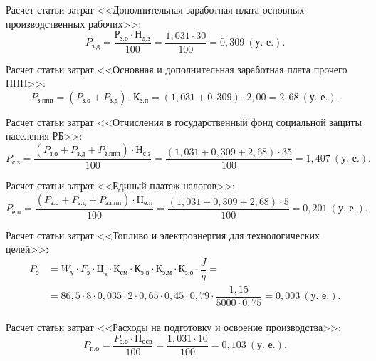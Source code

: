 Расчет статьи затрат 
<<Дополнительная заработная плата основных производственных рабочих>>:
\begin{equation*}
P_{\text{з.д}} = 
\dfrac{\text{Р}_{\text{з.о}} \cdot \text{Н}_{\text{д.з}}}{100} = 
\dfrac{1{,}031 \cdot 30}{100} = 
0{,}309 \: (\text{у.~е.}).
\end{equation*}

Расчет статьи затрат 
<<Основная и дополнительная заработная плата прочего ППП>>:
\begin{equation*}
P_{\text{з.ппп}} = 
( P_{\text{з.о}} + P_{\text{з.д}} ) \cdot \text{К}_{\text{з.п}} =
( 1{,}031 + 0{,}309 ) \cdot 2{,}00 =
2{,}68 \: (\text{у.~е.}).
\end{equation*}

Расчет статьи затрат 
<<Отчисления в государственный фонд социальной защиты населения РБ>>:
\begin{equation*}
P_{\text{с.з}} = 
\dfrac{
  (P_{\text{з.о}} + P_{\text{з.д}}  + P_{\text{з.ппп}}) \cdot \text{Н}_{\text{с.з}}
}{
  100
} =
\dfrac{( 1{,}031 + 0{,}309 + 2{,}68 ) \cdot 35}{100} =
1{,}407 \: (\text{у.~е.}).
\end{equation*}

Расчет статьи затрат 
<<Единый платеж налогов>>:
\begin{equation*}
P_{\text{е.п}} = 
\dfrac{
  (P_{\text{з.о}} + P_{\text{з.д}}  + P_{\text{з.ппп}}) \cdot \text{Н}_{\text{е.п}}
}{
  100
} =
\dfrac{( 1{,}031 + 0{,}309 + 2{,}68 ) \cdot 5}{100} =
0{,}201 \: (\text{у.~е.}).
\end{equation*}

Расчет статьи затрат 
<<Топливо и электроэнергия для технологических целей>>:
\begin{align*}
P_{\text{э}} &= 
W_{\text{у}} \cdot F_{\text{э}} \cdot \text{Ц}_{\text{э}} \cdot
\text{К}_{\text{см}} \cdot \text{К}_{\text{э.в}} \cdot 
\text{К}_{\text{э.м}} \cdot \text{К}_{\text{з.о}} \cdot
\dfrac{J}{\eta} = \\
 &=
86{,}5 \cdot 8 \cdot 0{,}035 \cdot
2 \cdot 0{,}65 \cdot 0{,}45 \cdot 
0{,}79 \cdot 
\dfrac{1{,}15}{5000 \cdot 0{,}75} =
0{,}003 \: (\text{у.~е.}).
\end{align*}

Расчет статьи затрат 
<<Расходы на подготовку и освоение производства>>:
\begin{equation*}
P_{\text{п.о}} = 
\dfrac{
  P_{\text{з.о}} \cdot \text{Н}_{\text{осв}}
}{
  100
} =
\dfrac{1{,}031 \cdot 10}{100} =
0{,}103 \: (\text{у.~е.}).
\end{equation*}

